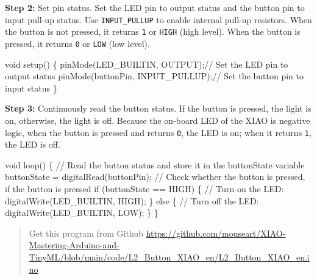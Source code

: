 \documentclass[
  letterpaper,
  DIV=11,
  numbers=noendperiod]{scrreprt}
\newenvironment{Shaded}{\begin{snugshade}}{\end{snugshade}}
\newcommand{\CommentTok}[1]{\textcolor[rgb]{0.37,0.37,0.37}{#1}}
\newcommand{\ControlFlowTok}[1]{\textcolor[rgb]{0.00,0.23,0.31}{#1}}
\newcommand{\DataTypeTok}[1]{\textcolor[rgb]{0.68,0.00,0.00}{#1}}
\newcommand{\NormalTok}[1]{\textcolor[rgb]{0.00,0.23,0.31}{#1}}
\newcommand{\OperatorTok}[1]{\textcolor[rgb]{0.37,0.37,0.37}{#1}}
\begin{document}
\textbf{Step 2:} Set pin status. Set the LED pin to output status and
the button pin to input pull-up status. Use \texttt{INPUT\_PULLUP} to
enable internal pull-up resistors. When the button is not pressed, it
returns \texttt{1} or \texttt{HIGH} (high level). When the button is
pressed, it returns \texttt{0} or \texttt{LOW} (low level).

\begin{Shaded}
\begin{Highlighting}[]
\DataTypeTok{void}\NormalTok{ setup}\OperatorTok{()} \OperatorTok{\{}
\NormalTok{    pinMode}\OperatorTok{(}\NormalTok{LED\_BUILTIN}\OperatorTok{,}\NormalTok{ OUTPUT}\OperatorTok{);}\CommentTok{// Set the LED pin to output status}
\NormalTok{    pinMode}\OperatorTok{(}\NormalTok{buttonPin}\OperatorTok{,}\NormalTok{ INPUT\_PULLUP}\OperatorTok{);}\CommentTok{// Set the button pin to input status}
\OperatorTok{\}}
\end{Highlighting}
\end{Shaded}

\textbf{Step 3:} Continuously read the button status. If the button is
pressed, the light is on, otherwise, the light is off. Because the
on-board LED of the XIAO is negative logic, when the button is pressed
and returns \texttt{0}, the LED is on; when it returns \texttt{1}, the
LED is off.

\begin{Shaded}
\begin{Highlighting}[]
\DataTypeTok{void}\NormalTok{ loop}\OperatorTok{()} \OperatorTok{\{}
    \CommentTok{// Read the button status and store it in the buttonState variable}
\NormalTok{    buttonState }\OperatorTok{=}\NormalTok{ digitalRead}\OperatorTok{(}\NormalTok{buttonPin}\OperatorTok{);}  
    \CommentTok{// Check whether the button is pressed, if the button is pressed}
    \ControlFlowTok{if} \OperatorTok{(}\NormalTok{buttonState }\OperatorTok{==}\NormalTok{ HIGH}\OperatorTok{)} \OperatorTok{\{}
        \CommentTok{// Turn on the LED:}
\NormalTok{        digitalWrite}\OperatorTok{(}\NormalTok{LED\_BUILTIN}\OperatorTok{,}\NormalTok{ HIGH}\OperatorTok{);}
    \OperatorTok{\}}
    \ControlFlowTok{else} \OperatorTok{\{}
        \CommentTok{// Turn off the LED:}
\NormalTok{        digitalWrite}\OperatorTok{(}\NormalTok{LED\_BUILTIN}\OperatorTok{,}\NormalTok{ LOW}\OperatorTok{);}
    \OperatorTok{\}}
\OperatorTok{\}}
\end{Highlighting}
\end{Shaded}

\begin{quote}
Get this program from Github
\url{https://github.com/mouseart/XIAO-Mastering-Arduino-and-TinyML/blob/main/code/L2_Button_XIAO_en/L2_Button_XIAO_en.ino}
\end{quote}
\end{document}

